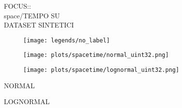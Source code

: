 \documentclass{article}
\begin{document}
\begin{figure}[!htbp]
\fbox
{
\begin{minipage}[t][0.98\textheight][t]{\textwidth}
\centering
    \begin{minipage}{0.23\linewidth}
    \footnotesize{FOCUS::\\ space/TEMPO SU \\ DATASET SINTETICI}
    \end{minipage}
   \begin{minipage}{0.75\linewidth}
        \begin{figure}[H]
        \texttt{[image: legends/no\_label]}
        \end{figure}
    \end{minipage}
    \vfill

   \begin{minipage}{0.48\linewidth}
        \begin{figure}[H]
        \texttt{[image: plots/spacetime/normal\_uint32.png]}
        \end{figure}
    \end{minipage}
    \begin{minipage}{0.48\linewidth}
        \begin{figure}[H]
        \texttt{[image: plots/spacetime/lognormal\_uint32.png]} 
        \end{figure}
    \end{minipage}
    \begin{minipage}{0.48\linewidth}
    \begin{center}
        NORMAL
    \end{center}
    \end{minipage}
    \begin{minipage}{0.48\linewidth}
    \begin{center}
        LOGNORMAL
    \end{center}
    \end{minipage}

    \vfill


\end{minipage}}
\end{figure}
\end{document}
